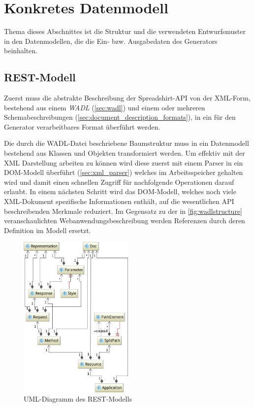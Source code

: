 \section{Konkretes Datenmodell}
\label{sec:concrete_model}

Thema dieses Abschnittes ist die Struktur und die verwendeten Entwurfsmuster in den Datenmodellen, die die Ein- bzw. Ausgabedaten des Generators beinhalten.

\subsection{REST-Modell}
\label{sec:rest_model}

Zuerst muss die abstrakte Beschreibung der Spreadshirt-API von der XML-Form, bestehend aus einem \emph{WADL} (\cref{sec:wadl}) und einem oder mehreren Schemabeschreibungen (\cref{sec:document_description_formats}), in ein für den Generator verarbeitbares Format überführt werden.

Die durch die WADL-Datei beschriebene Baumstruktur muss in ein Datenmodell bestehend aus Klassen und Objekten transformiert werden.
Um effektiv mit der XML Darstellung arbeiten zu können wird diese zuerst mit einem Parser in ein DOM-Modell überführt (\cref{sec:xml_parser}) welches im Arbeitsspeicher gehalten wird und damit einen schnellen Zugriff für nachfolgende Operationen darauf erlaubt. In einem nächsten Schritt wird das DOM-Modell, welches noch viele XML-Dokument spezifische Informationen enthält, auf die wesentlichen API beschreibenden Merkmale reduziert. Im Gegensatz zu der in \cref{fig:wadlstructure} veranschaulichten Webanwendungsbeschreibung werden Referenzen durch deren Definition im Modell ersetzt.

\begin{figure}[tb]
    \begin{center}
        \includegraphics[width=0.5\textwidth]{resources/restmodel}
    \end{center}
    \caption{UML-Diagramm des REST-Modells}
    \label{fig:restmodel}
\end{figure}

